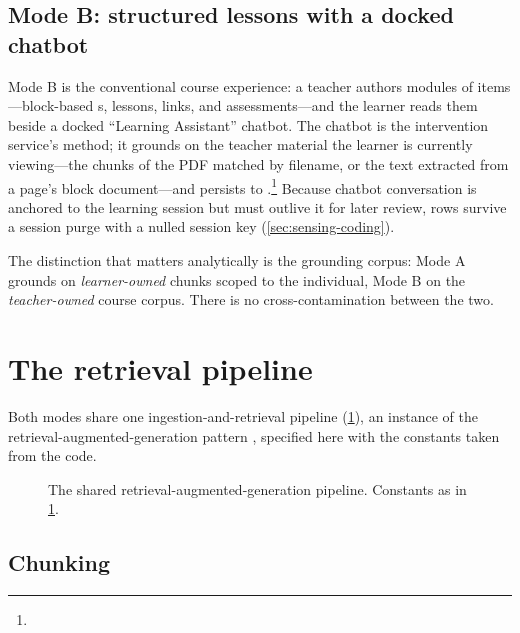 \subsection{Mode B: structured lessons with a docked chatbot}
\label{sec:modes-b}

Mode B is the conventional course experience: a teacher authors modules of
items---block-based s,  lessons, links, and
assessments---and the learner reads them beside a docked ``Learning
Assistant'' chatbot. The chatbot is the intervention service's
 method; it grounds on the teacher material the learner is
currently viewing---the chunks of the PDF matched by filename, or the text
extracted from a page's block document---and persists to
.\footnote{}
Because chatbot conversation is anchored to the learning session but must
outlive it for later review,  rows survive a
session purge with a nulled session key (\cref{sec:sensing-coding}).

The distinction that matters analytically is the grounding corpus: Mode A
grounds on \emph{learner-owned} chunks scoped to the individual, Mode B on
the \emph{teacher-owned} course corpus. There is no cross-contamination
between the two.

\section{The retrieval pipeline}
\label{sec:modes-rag}

Both modes share one ingestion-and-retrieval pipeline
(\cref{fig:rag-pipeline}), an instance of the retrieval-augmented-generation
pattern \citep{lewis2020rag}, specified here with the constants taken from
the code.

\begin{figure}[htbp]
\centering
{}
\caption[RAG pipeline]{The shared retrieval-augmented-generation pipeline.
Constants as in \cref{sec:modes-rag}.}
\label{fig:rag-pipeline}
\end{figure}

\subsection{Chunking}
\label{sec:modes-chunking}

